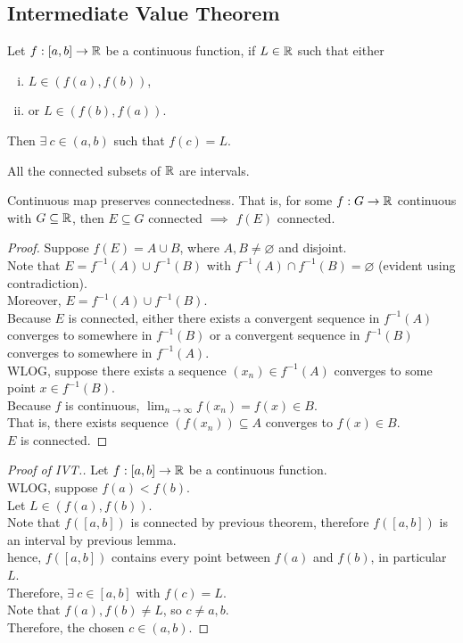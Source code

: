 \documentclass[11pt]{article}
\begin{document}
	\subsection{Intermediate Value Theorem}
	\begin{theorem}
		Let $f: [a, b] \to \mathbb{R}$ be a continuous function, if $L \in \mathbb{R}$ such that either
		\begin{enumerate}[(i)]
			\item $L \in (f(a), f(b))$,
			\item or $L \in (f(b), f(a))$.
		\end{enumerate}
		Then $\exists\ c \in (a, b)$ such that $f(c) = L$.
	\end{theorem}
	
	\begin{lemma}
		All the connected subsets of $\mathbb{R}$ are intervals.
	\end{lemma}
	
	\begin{theorem}
		Continuous map preserves connectedness. That is, for some $f: G \to \mathbb{R}$ continuous with $G \subseteq \mathbb{R}$, then $E \subseteq G$ connected $\implies$ $f(E)$ connected.
	\end{theorem}
	
	\begin{proof}
		Suppose $f(E) = A \cup B$, where $A, B \neq \varnothing$ and disjoint. \\
		Note that $E = f^{-1}(A) \cup f^{-1}(B)$ with $f^{-1}(A) \cap f^{-1}(B) = \varnothing$ (evident using contradiction). \\
		Moreover, $E = f^{-1}(A) \cup f^{-1}(B)$. \\
		Because $E$ is connected, either there exists a convergent sequence in $f^{-1}(A)$ converges to somewhere in $f^{-1}(B)$ or a convergent sequence in $f^{-1}(B)$ converges to somewhere in $f^{-1}(A)$. \\
		WLOG, suppose there exists a sequence $(x_n) \in f^{-1}(A)$ converges to some point $x \in f^{-1}(B)$. \\
		Because $f$ is continuous, $\lim_{n \to \infty} f(x_n) = f(x) \in B$. \\
		That is, there exists sequence $(f(x_n)) \subseteq A$ converges to $f(x) \in B$. \\
		$E$ is connected.
	\end{proof}
	
	\begin{proof}[Proof of IVT.]
		Let $f: [a, b] \to \mathbb{R}$ be a continuous function. \\
		WLOG, suppose $f(a) < f(b)$. \\
		Let $L \in (f(a), f(b))$. \\
		Note that $f([a, b])$ is connected by previous theorem, therefore $f([a, b])$ is an interval by previous lemma. \\
		hence, $f([a, b])$ contains every point between $f(a)$ and $f(b)$, in particular $L$. \\
		Therefore, $\exists\ c \in [a, b]$ with $f(c) = L$. \\
		Note that $f(a), f(b) \neq L$, so $c \neq a, b$. \\
		Therefore, the chosen $c \in (a, b)$.
	\end{proof}
	
\end{document}
